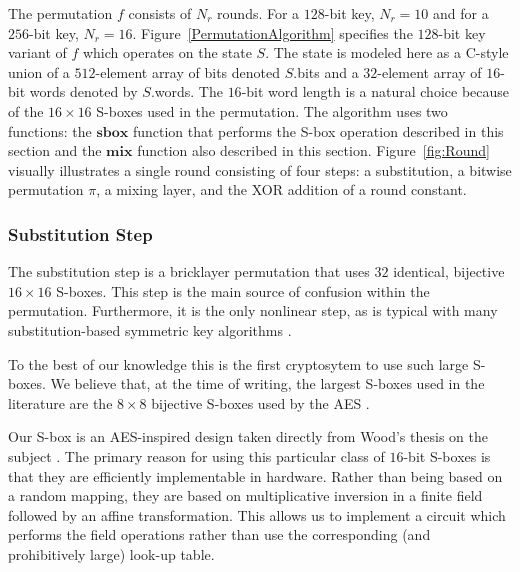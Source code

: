 The permutation $f$ consists of $N_r$ rounds.
For a $128$-bit key, $N_r = 10$ and for a $256$-bit key, $N_r = 16$.
Figure~\ref{PermutationAlgorithm} specifies the $128$-bit key variant of $f$ which operates on the state $S$.
The state is modeled here as a C-style union of a $512$-element array of bits denoted $S$.bits and a $32$-element array of $16$-bit words denoted by $S$.words.
The $16$-bit word length is a natural choice because of the $16 \times 16$ S-boxes used in the permutation.
The algorithm uses two functions: the $\mathbf{sbox}$ function that performs the S-box operation described in this section and the $\mathbf{mix}$ function also described in this section.
Figure~\ref{fig:Round} visually illustrates a single round consisting of four steps: a substitution, a bitwise permutation $\pi$, a mixing layer, and the XOR addition of a round constant.

\subsubsection{Substitution Step}
The substitution step is a bricklayer permutation that uses $32$ identical, bijective $16 \times 16$ S-boxes.
This step is the main source of confusion within the permutation.
Furthermore, it is the only nonlinear step, as is typical with many substitution-based symmetric key algorithms \cite{Stinson2006_CTAP}.

To the best of our knowledge this is the first cryptosytem to use such large S-boxes.
We believe that, at the time of writing, the largest S-boxes used in the literature are the $8 \times 8$ bijective S-boxes used by the AES \cite{Daemen2002_DesignOfRijndael}\cite{NIST2001_FIPS-197}.

Our S-box is an AES-inspired design taken directly from Wood's thesis on the subject \cite{Wood2013_SboxThesis}.
The primary reason for using this particular class of $16$-bit S-boxes is that they are efficiently implementable in hardware.
Rather than being based on a random mapping, they are based on multiplicative inversion in a finite field followed by an affine transformation.
This allows us to implement a circuit which performs the field operations rather than use the corresponding (and prohibitively large) look-up table.

